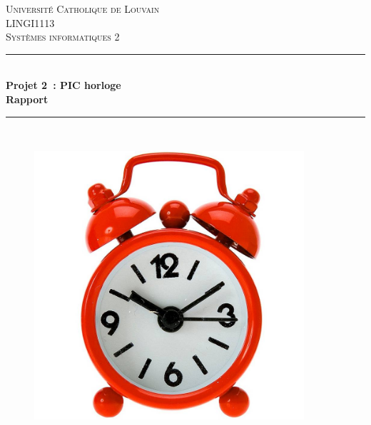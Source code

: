 \documentclass[12pt,a4paper]{article}
\begin{document}
	
\begin{titlepage}
\newcommand{\HRule}{\rule{\linewidth}{0.5mm}} %
\centering %
 
\null
\vspace{2cm}
\textsc{\Large Université Catholique de Louvain}\\[1cm] %
\textsc{\large LINGI1113 \\[0.3cm] Systèmes informatiques 2}\\[0.5cm] %


\HRule \\[0.4cm]
{ \LARGE \bfseries Projet 2~: PIC horloge\\[0.4cm] %
\large \bfseries Rapport} \\[0.4cm]

\HRule \\[0.5cm]
 
\begin{figure}[!h]
	\begin{center}
		\includegraphics[width=10cm]{image.jpg}
	\end{center}
\end{figure}


\end{titlepage}
\end{document}
